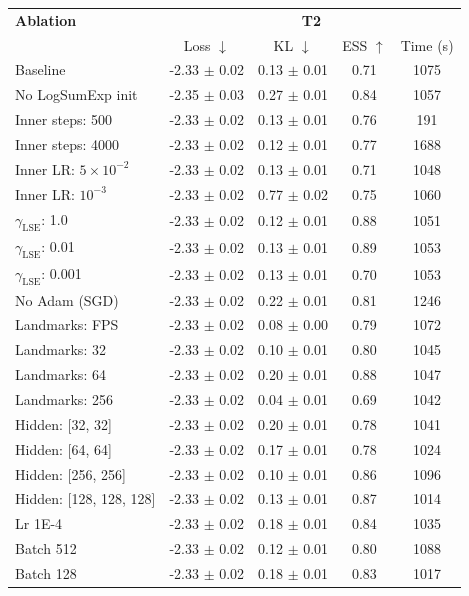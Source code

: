 \begin{tabular}{lcccc}
\toprule
\textbf{Ablation} & \multicolumn{4}{c}{\textbf{T2}} \\
 & Loss $\downarrow$ & KL $\downarrow$ & ESS $\uparrow$ & Time (s) \\
\midrule
Baseline & -2.33 $\pm$ 0.02 & 0.13 $\pm$ 0.01 & 0.71 & 1075 \\
No LogSumExp init & -2.35 $\pm$ 0.03 & 0.27 $\pm$ 0.01 & 0.84 & 1057 \\
Inner steps: 500 & -2.33 $\pm$ 0.02 & 0.13 $\pm$ 0.01 & 0.76 & 191 \\
Inner steps: 4000 & -2.33 $\pm$ 0.02 & 0.12 $\pm$ 0.01 & 0.77 & 1688 \\
Inner LR: $5 \times 10^{-2}$ & -2.33 $\pm$ 0.02 & 0.13 $\pm$ 0.01 & 0.71 & 1048 \\
Inner LR: $10^{-3}$ & -2.33 $\pm$ 0.02 & 0.77 $\pm$ 0.02 & 0.75 & 1060 \\
$\gamma_{\text{LSE}}$: 1.0 & -2.33 $\pm$ 0.02 & 0.12 $\pm$ 0.01 & 0.88 & 1051 \\
$\gamma_{\text{LSE}}$: 0.01 & -2.33 $\pm$ 0.02 & 0.13 $\pm$ 0.01 & 0.89 & 1053 \\
$\gamma_{\text{LSE}}$: 0.001 & -2.33 $\pm$ 0.02 & 0.13 $\pm$ 0.01 & 0.70 & 1053 \\
No Adam (SGD) & -2.33 $\pm$ 0.02 & 0.22 $\pm$ 0.01 & 0.81 & 1246 \\
Landmarks: FPS & -2.33 $\pm$ 0.02 & 0.08 $\pm$ 0.00 & 0.79 & 1072 \\
Landmarks: 32 & -2.33 $\pm$ 0.02 & 0.10 $\pm$ 0.01 & 0.80 & 1045 \\
Landmarks: 64 & -2.33 $\pm$ 0.02 & 0.20 $\pm$ 0.01 & 0.88 & 1047 \\
Landmarks: 256 & -2.33 $\pm$ 0.02 & 0.04 $\pm$ 0.01 & 0.69 & 1042 \\
Hidden: [32, 32] & -2.33 $\pm$ 0.02 & 0.20 $\pm$ 0.01 & 0.78 & 1041 \\
Hidden: [64, 64] & -2.33 $\pm$ 0.02 & 0.17 $\pm$ 0.01 & 0.78 & 1024 \\
Hidden: [256, 256] & -2.33 $\pm$ 0.02 & 0.10 $\pm$ 0.01 & 0.86 & 1096 \\
Hidden: [128, 128, 128] & -2.33 $\pm$ 0.02 & 0.13 $\pm$ 0.01 & 0.87 & 1014 \\
Lr 1E-4 & -2.33 $\pm$ 0.02 & 0.18 $\pm$ 0.01 & 0.84 & 1035 \\
Batch 512 & -2.33 $\pm$ 0.02 & 0.12 $\pm$ 0.01 & 0.80 & 1088 \\
Batch 128 & -2.33 $\pm$ 0.02 & 0.18 $\pm$ 0.01 & 0.83 & 1017 \\
\bottomrule
\end{tabular}